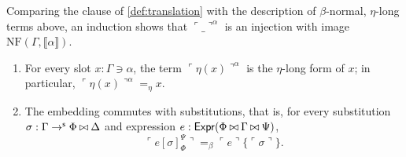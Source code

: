 Comparing the clause of \cref{def:translation} with the description of $\beta$-normal, $\eta$-long terms above, an induction shows that $\ulcorner \_ \urcorner^\alpha$ is an injection with image $\mathrm{NF}(\Gamma, \llbracket \alpha \rrbracket)$.

\begin{lemma}\label{lem:translation}
    \begin{enumerate}
        \item For every slot $x : \Gamma \ni \alpha$, the term $\ulcorner \eta(x) \urcorner^\alpha$ is the $\eta$-long form of $x$; in particular, $\ulcorner \eta(x) \urcorner^\alpha =_\eta x$.
        \item The embedding commutes with substitutions, that is, for every substitution $\sigma : \Gamma \to^{\mathsf{s}} \Phi \mathbin{\bowtie} \Delta$ and expression $e : \mathsf{Expr}(\Phi \mathbin{\bowtie} \Gamma \mathbin{\bowtie} \Psi)$,
        \[
        \ulcorner e[\sigma]_\Phi^\Psi \urcorner =_\beta \ulcorner e \urcorner\{\ulcorner \sigma \urcorner\}.
        \]
    \end{enumerate}
\end{lemma}

